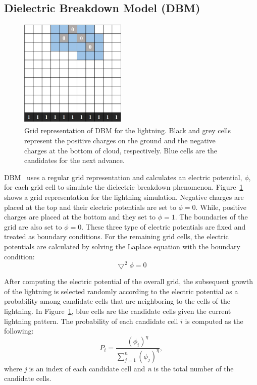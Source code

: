 \subsection{Dielectric Breakdown Model (DBM)}


\begin{figure}[t]
	\centering
	\includegraphics[width=2.0in]{fig/dbm_grid}
	\caption{Grid representation of DBM for the lightning. Black and grey
cells represent  the positive charges on the ground and the negative charges at
the bottom of cloud, respectively. Blue cells are the candidates for the next
advance. }
	\label{fig_dbm_grid}
\end{figure}

DBM~\cite{Niemeyer1984} uses a regular grid representation and calculates an
electric potential, $\phi$, for each grid cell to simulate the dielectric
breakdown
phenomenon. Figure~\ref{fig_dbm_grid} shows a grid representation for the
lightning simulation. Negative charges are placed at the top and their electric
potentials are set to $\phi=0$. While, positive charges are placed at the
bottom and they
set to $\phi=1$. The boundaries of the grid are also set to $\phi=0$. These
three type of electric potentials are fixed and treated as boundary conditions.
For the remaining grid cells, the electric potentials are calculated by solving
the Laplace equation with the boundary condition:
\begin{equation} \label{eq_laplace}
\bigtriangledown^2\phi = 0
\end{equation}

After computing the electric potential of the overall grid, the subsequent
growth of the lightning is selected randomly according to the electric
potential as a probability among candidate cells that are neighboring to
the cells of
the lightning. In Figure~\ref{fig_dbm_grid}, blue cells are the candidate cells
given the current lightning pattern. The probability of each candidate cell $i$
is computed as the following:
\begin{equation} \label{eq_prob}
P_{i} = \frac{(\phi_{i})^\eta}{\sum_{j=1}^{n} (\phi_{j})^\eta},
\end{equation}
where 
\textit{j} is an index of each candidate cell and \textit{n} is the  total
number of the candidate cells.


